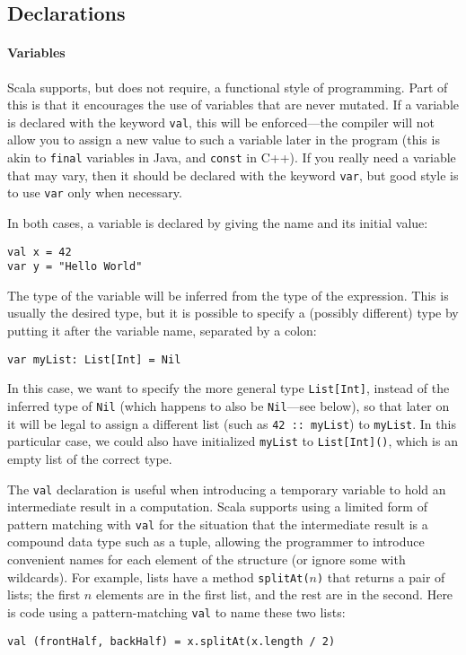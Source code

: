 \subsection{Declarations}
\paragraph{Variables}
 Scala supports, but does not require, a functional style of programming. Part of this is that it encourages the use of variables that are never mutated. If a variable is declared with the keyword \texttt{val}, this will be enforced---the compiler will not allow you to assign a new value to such a variable later in the program (this is akin to \texttt{final} variables in Java, and \texttt{const} in C++). If you really need a variable that may vary, then it should be declared with the keyword \texttt{var}, but good style is to use \texttt{var} only when necessary.

In both cases, a variable is declared by giving the name and its initial value:
\begin{verbatim}
val x = 42
var y = "Hello World"
\end{verbatim}
The type of the variable will be inferred from the type of the expression. This is usually the desired type, but it is possible to specify a (possibly different) type by putting it after the variable name, separated by a colon:
\begin{verbatim}
var myList: List[Int] = Nil
\end{verbatim}
In this case, we want to specify the more general type \texttt{List[Int]}, instead of the inferred type of \texttt{Nil} (which happens to also be \texttt{Nil}---see below), so that later on it will be legal to assign a different list (such as \verb|42 :: myList|) to \texttt{myList}. In this particular case, we could also have initialized \texttt{myList} to \texttt{List[Int]()}, which is an empty list of the correct type.

The \texttt{val} declaration is useful when introducing a temporary variable to hold an intermediate result in a computation. Scala supports using a limited form of pattern matching with \texttt{val} for the situation that the intermediate result is a compound data type such as a tuple, allowing the programmer to introduce convenient names for each element of the structure (or ignore some with wildcards). For example, lists have a method \texttt{splitAt($n$)} that returns a pair of lists; the first $n$ elements are in the first list, and the rest are in the second. Here is code using a pattern-matching \texttt{val} to name these two lists:
\begin{verbatim}
val (frontHalf, backHalf) = x.splitAt(x.length / 2)
\end{verbatim}

